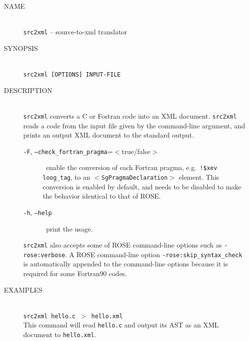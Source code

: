 \begin{framed}
\begin{description}
 \item[NAME]~\\
	    \texttt{src2xml} -- source-to-xml translator

 \item[SYNOPSIS]~\\
	    \texttt{src2xml [OPTIONS] INPUT-FILE}

 \item[DESCRIPTION]~\\ \texttt{src2xml} converts a C or Fortran code
	    into an XML document. \texttt{src2xml} reads a code from the
	    input file given by the command-line argument, and prints
	    an output XML document to the standard
	    output. 
	    \begin{description}
	    \item[\texttt{-F}, \texttt{--check\_fortran\_pragma}=$<$true/false$>$]
	    ~\newline enable the conversion of each Fortran pragma, e.g.~\texttt{!\$xev loog\_tag}, to an \texttt{$<$SgPragmaDeclaration$>$} element. This conversion is enabled by default, and needs to be disabled to make the behavior identical to that of ROSE. 
	    \item[\texttt{-h}, \texttt{--help}] ~\newline print the usage.
	    \end{description}
	    
	    \texttt{src2xml} also accepts some of ROSE command-line
	    options such as \texttt{-rose:verbose}. A ROSE
	    command-line option \texttt{-rose:skip\_syntax\_check} is
	    automatically appended to the command-line options because
	    it is required for some Fortran90 codes.

 \item[EXAMPLES]~\\ \texttt{src2xml hello.c $>$ hello.xml}\\ This command
	    will read \texttt{hello.c} and output its AST as an XML
	    document to \texttt{hello.xml}.
\end{description}
\end{framed}

